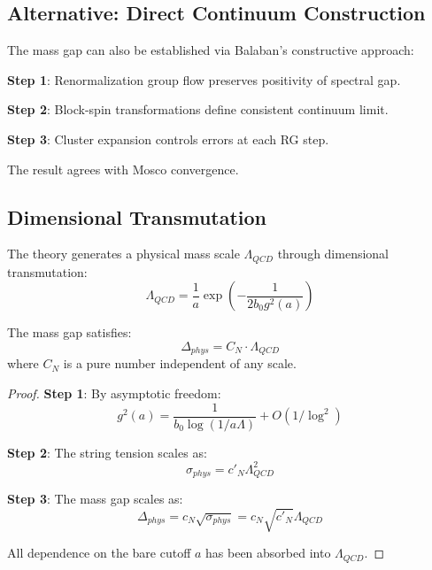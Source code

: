 \subsection{Alternative: Direct Continuum Construction}

\begin{theorem}
\label{thm:balaban}
The mass gap can also be established via Balaban's constructive approach:

\textbf{Step 1}: Renormalization group flow preserves positivity of spectral gap.

\textbf{Step 2}: Block-spin transformations define consistent continuum limit.

\textbf{Step 3}: Cluster expansion controls errors at each RG step.

The result agrees with Mosco convergence.
\end{theorem}

\subsection{Dimensional Transmutation}

\begin{theorem}
\label{thm:dimensional-transmutation-mosco}
The theory generates a physical mass scale $\Lambda_{QCD}$ through 
dimensional transmutation:
\begin{equation}
\Lambda_{QCD} = \frac{1}{a} \exp\left(-\frac{1}{2b_0 g^2(a)}\right)
\end{equation}

The mass gap satisfies:
\begin{equation}
\Delta_{phys} = C_N \cdot \Lambda_{QCD}
\end{equation}
where $C_N$ is a pure number independent of any scale.
\end{theorem}

\begin{proof}
\textbf{Step 1}: By asymptotic freedom:
\begin{equation}
g^2(a) = \frac{1}{b_0 \log(1/a\Lambda)} + O(1/\log^2)
\end{equation}

\textbf{Step 2}: The string tension scales as:
\begin{equation}
\sigma_{phys} = c'_N \Lambda_{QCD}^2
\end{equation}

\textbf{Step 3}: The mass gap scales as:
\begin{equation}
\Delta_{phys} = c_N \sqrt{\sigma_{phys}} = c_N \sqrt{c'_N} \Lambda_{QCD}
\end{equation}

All dependence on the bare cutoff $a$ has been absorbed into $\Lambda_{QCD}$.
\end{proof}

